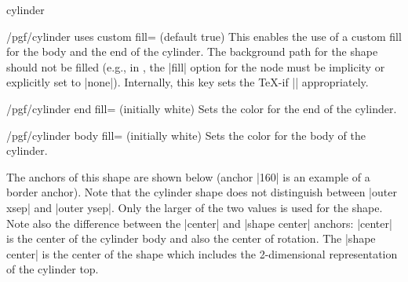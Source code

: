 \begin{shape}{cylinder}
    \begin{key}{/pgf/cylinder uses custom fill= (default true)}
      This enables the use of a custom fill for the body and the end of the
      cylinder. The background path for the shape should not be filled (e.g.,
      in \tikzname{}, the |fill| option for the node must be implicity or
      explicitly set to |none|). Internally, this key sets the \TeX-if
      |\ifpgfcylinderusescustomfill| appropriately.
    \end{key}
\begin{codeexample}[preamble={\usetikzlibrary{shapes.geometric}}]
\end{codeexample}

    \begin{key}{/pgf/cylinder end fill= (initially white)}
        Sets the color for the end of the cylinder.
    \end{key}

    \begin{key}{/pgf/cylinder body fill= (initially white)}
        Sets the color for the body of the cylinder.
    \end{key}

    The anchors of this shape are shown below (anchor |160| is an example of a
    border anchor). Note that the cylinder shape does not distinguish between
    |outer xsep| and |outer ysep|. Only the larger of the two values is used
    for the shape. Note also the difference between the |center| and
    |shape center| anchors: |center| is the center of the cylinder body and
    also the center of rotation. The |shape center| is the center of the shape
    which includes the 2-dimensional representation of the cylinder top.
\begin{codeexample}[preamble={\usetikzlibrary{shapes.geometric}}]
\Huge
{}
\end{codeexample}
\end{shape}


